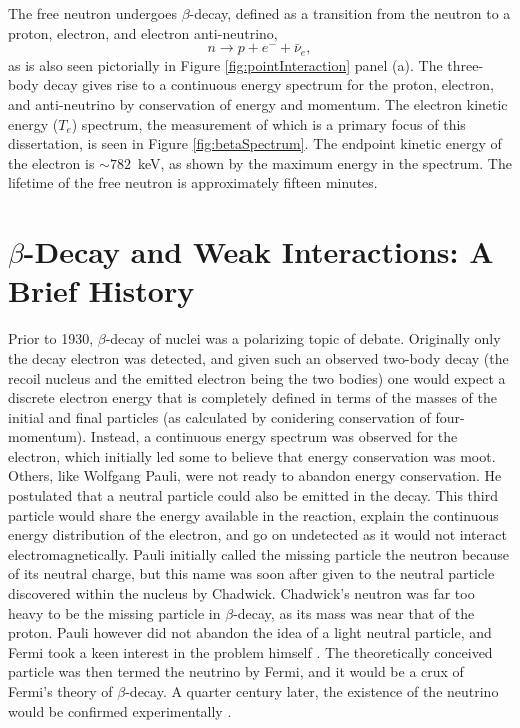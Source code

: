 The free neutron undergoes $\beta$-decay, defined as a transition from the neutron
to a proton, electron, and electron anti-neutrino,
\begin{equation*}
  n\rightarrow p + e^- + \bar{\nu}_{e},
\end{equation*}
\noindent as is also seen pictorially in Figure \ref{fig:pointInteraction} panel (a).
The three-body decay gives rise to a continuous energy spectrum
for the proton, electron, and anti-neutrino by conservation of energy and momentum.
The electron kinetic energy ($T_e$) spectrum, the measurement of which is a primary focus of this
dissertation, is seen in Figure \ref{fig:betaSpectrum}. The endpoint kinetic energy of the electron
is $\sim 782$~keV, as shown by the maximum energy in the spectrum. The lifetime of the free neutron is
approximately fifteen minutes.


\section{$\beta$-Decay and Weak Interactions: A Brief History}

Prior to 1930, $\beta$-decay of nuclei was a polarizing topic of debate. Originally
only the decay electron was detected, and given such an observed two-body decay (the recoil
nucleus and the emitted electron being the two bodies) one would expect a discrete
electron energy that is completely defined in terms of the masses of the initial and
final particles (as calculated by conidering conservation of four-momentum).
Instead, a continuous energy spectrum was observed for the electron, which
initially led some to believe that energy conservation was moot. Others, like
Wolfgang Pauli, were not ready
to abandon energy conservation. He postulated that a neutral particle
could also be emitted in the decay. This third particle would share the energy available
in the reaction, explain the continuous energy distribution of the electron, and go
on undetected as it would not interact electromagnetically.
Pauli initially called the missing particle the neutron because of its neutral charge, but this name
was soon after given to the neutral particle discovered within the nucleus by Chadwick. Chadwick's
neutron was far too heavy
to be the missing particle in $\beta$-decay, as its mass was near that of the proton.
Pauli however did not abandon the idea of a light neutral particle, and Fermi took a keen
interest in the problem himself \cite{pauli1994writings}. The theoretically conceived particle was then termed
the neutrino by Fermi, and it would be a crux of Fermi's theory of $\beta$-decay.
A quarter century later, the existence of the neutrino would be confirmed
experimentally \cite{cowan1956detection}.

